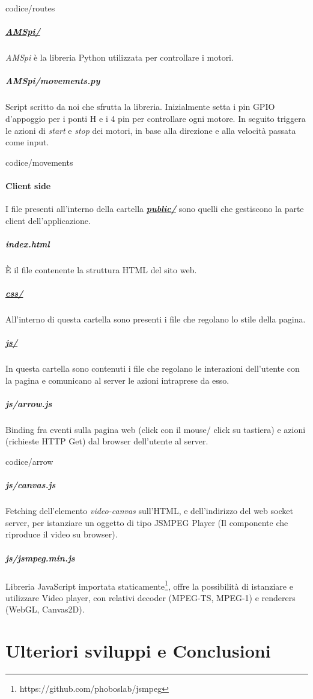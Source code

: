 \documentclass[11pt]{article}
\begin{document}
\begin{lstinputlisting}[caption={routes.js},basicstyle=\tiny]{codice/routes}
\end{lstinputlisting}
\subparagraph{\underline{AMSpi/}}
\textit{AMSpi} è la libreria Python utilizzata per controllare i motori. 
\subparagraph{AMSpi/movements.py}
Script scritto da noi che sfrutta la libreria. Inizialmente setta i pin GPIO d'appoggio per i ponti H e i 4 pin per controllare ogni motore. In seguito triggera le azioni di \textit{start} e \textit{stop} dei motori, in base alla direzione e alla velocità passata come input.
\begin{lstinputlisting}[caption={AMSpy/movements.py},basicstyle=\tiny]{codice/movements}
\end{lstinputlisting}
\paragraph{Client side}
I file presenti all'interno della cartella \underline{\textbf{\textit{public/}}} sono quelli che gestiscono la parte client dell'applicazione.\\
\subparagraph{index.html} 
È il file contenente la struttura HTML del sito web.
\subparagraph{\underline{css/}}
All'interno di questa cartella sono presenti i file che regolano lo stile della pagina.
\subparagraph{\underline{js/}}
In questa cartella sono contenuti i file che regolano le interazioni dell'utente con la pagina e comunicano al server le azioni intraprese da esso.
\subparagraph{js/arrow.js}
Binding fra eventi sulla pagina web (click con il mouse/ click su tastiera) e azioni (richieste HTTP Get) dal browser dell'utente al server.
\begin{lstinputlisting}[caption={js/arrow.js},basicstyle=\tiny]{codice/arrow}
\end{lstinputlisting}
\subparagraph{js/canvas.js}
Fetching dell'elemento \textit{video-canvas} sull'HTML, e dell'indirizzo del web socket server, per istanziare un oggetto di tipo JSMPEG Player (Il componente che riproduce il video su browser).
\subparagraph{js/jsmpeg.min.js}
Libreria JavaScript importata staticamente\footnote{https://github.com/phoboslab/jsmpeg}, offre la possibilità di istanziare e utilizzare Video player, con relativi decoder (MPEG-TS, MPEG-1)  e renderers (WebGL, Canvas2D).

\section{Ulteriori sviluppi e Conclusioni}	
%
%
\end{document}
